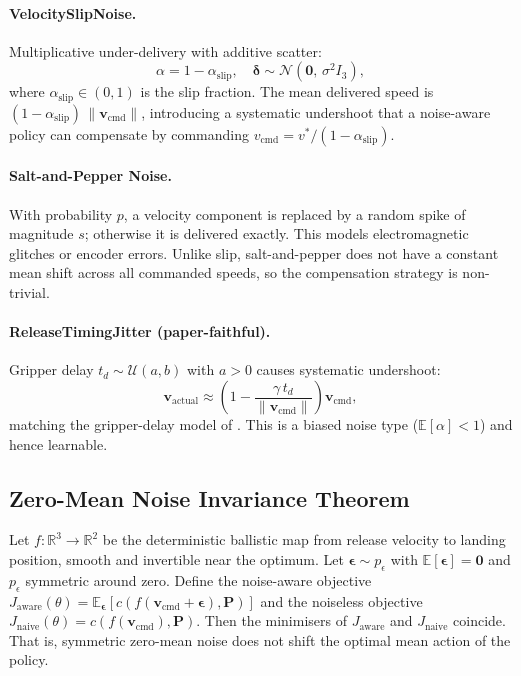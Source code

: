 \paragraph{VelocitySlipNoise.}
Multiplicative under-delivery with additive scatter:
\begin{equation}
  \alpha = 1 - \alpha_{\mathrm{slip}}, \quad
  \boldsymbol{\delta} \sim \mathcal{N}(\mathbf{0},\, \sigma^2 I_3),
  \label{eq:slip_noise}
\end{equation}
where $\alpha_{\mathrm{slip}} \in (0, 1)$ is the slip fraction.
The mean delivered speed is $(1 - \alpha_{\mathrm{slip}})\,\|\mathbf{v}_{\mathrm{cmd}}\|$,
introducing a systematic undershoot that a noise-aware policy can compensate by
commanding $v_{\mathrm{cmd}} = v^* / (1 - \alpha_{\mathrm{slip}})$.

\paragraph{Salt-and-Pepper Noise.}
With probability $p$, a velocity component is replaced by a random spike of magnitude
$s$; otherwise it is delivered exactly.
This models electromagnetic glitches or encoder errors.
Unlike slip, salt-and-pepper does not have a constant mean shift across all
commanded speeds, so the compensation strategy is non-trivial.

\paragraph{ReleaseTimingJitter (paper-faithful).}
Gripper delay $t_d \sim \mathcal{U}(a, b)$ with $a > 0$ causes systematic undershoot:
\begin{equation}
  \mathbf{v}_{\mathrm{actual}} \approx
    \left(1 - \frac{\gamma\,t_d}{\|\mathbf{v}_{\mathrm{cmd}}\|}\right)
    \mathbf{v}_{\mathrm{cmd}},
  \label{eq:jitter_noise}
\end{equation}
matching the gripper-delay model of \cite{turcato2025mcpilot}.
This is a biased noise type ($\mathbb{E}[\alpha] < 1$) and hence learnable.

\subsection{Zero-Mean Noise Invariance Theorem}
\label{sec:study3:theory}

\begin{theorem}
\label{thm:zeromean}
Let $f: \mathbb{R}^3 \to \mathbb{R}^2$ be the deterministic ballistic map from release
velocity to landing position, smooth and invertible near the optimum.
Let $\boldsymbol{\epsilon} \sim p_\epsilon$ with $\mathbb{E}[\boldsymbol{\epsilon}] = \mathbf{0}$
and $p_\epsilon$ symmetric around zero.
Define the noise-aware objective
$J_{\mathrm{aware}}(\theta) = \mathbb{E}_{\boldsymbol{\epsilon}}[c(f(\mathbf{v}_{\mathrm{cmd}}
+ \boldsymbol{\epsilon}), \mathbf{P})]$
and the noiseless objective
$J_{\mathrm{naive}}(\theta) = c(f(\mathbf{v}_{\mathrm{cmd}}), \mathbf{P})$.
Then the minimisers of $J_{\mathrm{aware}}$ and $J_{\mathrm{naive}}$ coincide.
That is, symmetric zero-mean noise does not shift the optimal mean action of the policy.
\end{theorem}

